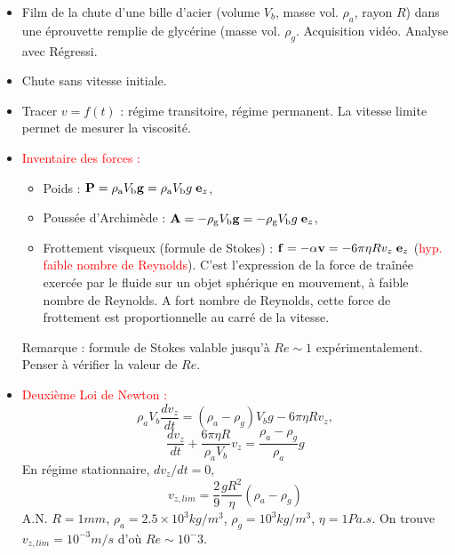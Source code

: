 \documentclass[11pt,a4paper]{report}
\begin{document}
\begin{itemize}
	\item Film de la chute d'une bille d'acier (volume $V_b$, masse vol. $\rho_a$, rayon $R$) dans une éprouvette remplie de glycérine (masse vol. $\rho_g$. Acquisition vidéo. Analyse avec Régressi.
	\item Chute sans vitesse initiale.
	\item Tracer $v = f(t)$ : régime transitoire, régime permanent. La vitesse limite permet de mesurer la viscosité.\\
	
	\item \textcolor{red}{Inventaire des forces :}
		\begin{itemize}
			\item Poids : $\bold{P} = \rho_{\text{a}}V_{\text{b}}\bold{g} = \rho_{\text{a}}V_{\text{b}}g\;\bold{e}_z$,
			\item Poussée d'Archimède : $\bold{A} = - \rho_{\text{g}}V_{\text{b}}\bold{g} = - \rho_{\text{g}}V_{\text{b}}g\;\bold{e}_z$,
			\item Frottement visqueux (formule de Stokes) : $\bold{f} = -\alpha\bold{v} = -6\pi\eta R v_{z}\;\bold{e}_z$ (\textcolor{red}{hyp. faible nombre de Reynolds}).
			C'est l'expression de la force de traînée exercée par le fluide sur un objet sphérique en mouvement, à faible nombre de Reynolds. 
			A fort nombre de Reynolds, cette force de frottement est proportionnelle au carré de la vitesse.
		\end{itemize}
		Remarque : formule de Stokes valable jusqu'à $Re \sim 1$ expérimentalement. Penser à vérifier la valeur de $Re$.\\
			
	\item \textcolor{red}{Deuxième Loi de Newton :}
	\begin{equation}
		\rho_a V_b \frac{dv_z}{dt} = \left(\rho_a-\rho_g\right)V_bg -6\pi\eta R v_z,
	\end{equation}
	\begin{equation}
		\frac{dv_z}{dt} + \frac{6\pi\eta R}{\rho_a V_b}v_z = \frac{\rho_a-\rho_g}{\rho_a}g
	\end{equation}
	En régime stationnaire, $dv_z/dt = 0$,
	\begin{equation}
		v_{z,lim} = \frac{2}{9}\frac{g R^2}{\eta}\left(\rho_a-\rho_g\right)
	\end{equation}
	A.N. $R = 1mm$, $\rho_a = 2.5\times 10^{3}kg/m^3$, $\rho_g = 10^3 kg/m^3$, $\eta = 1 Pa.s$. On trouve $v_{z,lim} = 10^{-3}m/s$ d'où $Re \sim 10^-3$.
\end{itemize}
\end{document}
